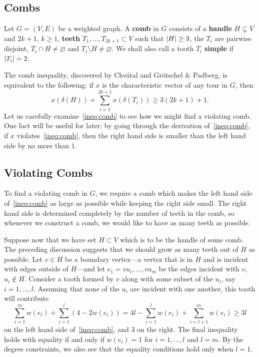 \documentclass[12pt, letterpaper]{amsart}
\theoremstyle{plain}
\theoremstyle{definition}
\theoremstyle{remark}
\DeclarePairedDelimiter{\abs}{\lvert}{\rvert}
\begin{document}
\subsection{Combs}
Let $G = (V,E)$ be a weighted graph. A
\textbf{comb} in $G$ consists of a \textbf{handle} $H \subsetneq V$ and $2k+1$,
$k \geq 1$, \textbf{teeth} $T_1,\ldots,T_{2k+1} \subset V$ such that $\abs{H}
\geq 3$, the $T_i$ are pairwise disjoint, $T_i \cap H \neq \varnothing$ and
$T_i \setminus H \neq \varnothing$. We shall also call a tooth $T_i$
\textbf{simple} if $\abs{T_i} = 2$.

The comb inequality, discovered by Chv\'atal and Gr\"otschel \& Padberg, is
equivalent to the following: if $x$ is the characteristic vector of any tour in
$G$, then
\begin{equation}\label{ineq:comb}
  x(\delta(H)) + \sum^{2k+1}_{i = 1}x(\delta(T_i)) \geq 3(2k+1) + 1.
\end{equation}
Let us carefully examine~\eqref{ineq:comb} to see how we might find a violating comb.
One fact will be useful for later: by going through the derivation
of~\eqref{ineq:comb}, if $x$ violates~\eqref{ineq:comb}, then the right hand
side is smaller than the left hand side by no more than $1$.

\subsection{Violating Combs}
To find a violating comb in $G$, we require a comb which makes the left hand
side of~\eqref{ineq:comb} as large as possible while keeping the right side
small. The right hand side is determined completely by the number of teeth in
the comb, so whenever we construct a comb, we would like to have as many teeth
as possible.

Suppose now that we have set $H \subset V$ which is to be the handle of some
comb. The preceding discussion suggests that we should grow as many teeth out
of $H$ as possible. Let $v \in H$ be a boundary vertex---a vertex that is in $H$
and is incident with edges outside of $H$---and let $e_1 = vu_i, \ldots,vu_m$ be
the edges incident with $v$, $u_i \notin H$. Consider a tooth formed by $v$
along with some subset of the $u_i$, say $i = 1,\ldots,l$. Assuming that none
of the $u_i$ are incident with one another, this tooth will contribute
\begin{equation*}
  \sum^m_{i = 1}w(e_i) + \sum^l_{i = 1} (4 - 2w(e_i)) = 4l - \sum^l_{i = 1} w(e_i) + \sum^m_{i = l + 1}w(e_i) \geq 3l
\end{equation*}
on the left hand side of~\eqref{ineq:comb}, and $3$ on the right. The final
inequality holds with equality if and only if $w(e_i) = 1$ for $i = 1,\ldots,l$
and $l = m$. By the degree constraints, we also see that the equality conditions
hold only when $l = 1$.
\end{document}
